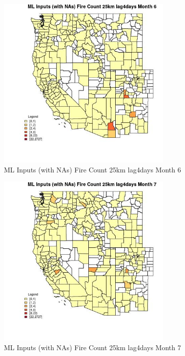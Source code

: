 \begin{figure} 
\centering  
\includegraphics[width=0.77\textwidth]{Code_Outputs/Report_ML_input_PM25_Step4_part_f_de_duplicated_aves_prioritize_24hr_obswNAs_CountyFire_Count_25km_lag4daysmedianMonth6.jpg} 
\caption{\label{fig:Report_ML_input_PM25_Step4_part_f_de_duplicated_aves_prioritize_24hr_obswNAsCountyFire_Count_25km_lag4daysmedianMonth6}ML Inputs (with NAs) Fire Count 25km lag4days Month 6} 
\end{figure} 
 

\begin{figure} 
\centering  
\includegraphics[width=0.77\textwidth]{Code_Outputs/Report_ML_input_PM25_Step4_part_f_de_duplicated_aves_prioritize_24hr_obswNAs_CountyFire_Count_25km_lag4daysmedianMonth7.jpg} 
\caption{\label{fig:Report_ML_input_PM25_Step4_part_f_de_duplicated_aves_prioritize_24hr_obswNAsCountyFire_Count_25km_lag4daysmedianMonth7}ML Inputs (with NAs) Fire Count 25km lag4days Month 7} 
\end{figure} 
 

